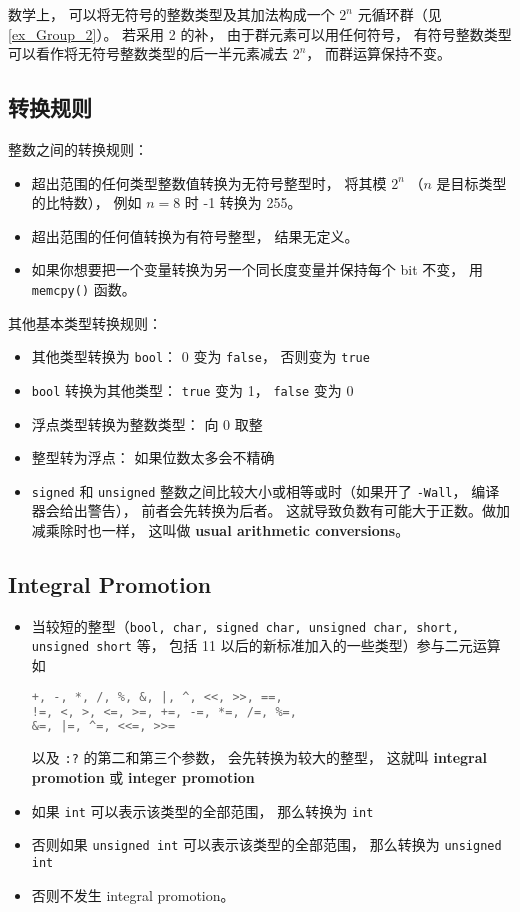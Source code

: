 数学上， 可以将无符号的整数类型及其加法构成一个 $2^n$ 元循环群（见\autoref{ex_Group_2}）。 若采用 2 的补， 由于群元素可以用任何符号， 有符号整数类型可以看作将无符号整数类型的后一半元素减去 $2^n$， 而群运算保持不变。

\subsection{转换规则}
整数之间的转换规则：
\begin{itemize}
\item 超出范围的任何类型整数值转换为无符号整型时， 将其模 $2^n$ （$n$ 是目标类型的比特数）， 例如 $n = 8$ 时 -1 转换为 255。
\item 超出范围的任何值转换为有符号整型， 结果无定义。
\item 如果你想要把一个变量转换为另一个同长度变量并保持每个 bit 不变， 用 \verb`memcpy()` 函数。
\end{itemize}
其他基本类型转换规则：
\begin{itemize}
\item 其他类型转换为 \verb`bool`： 0 变为 \verb`false`， 否则变为 \verb`true`
\item \verb`bool` 转换为其他类型： \verb`true` 变为 1， \verb`false` 变为 0
\item 浮点类型转换为整数类型： 向 0 取整
\item 整型转为浮点： 如果位数太多会不精确
\item \verb`signed` 和 \verb`unsigned` 整数之间比较大小或相等或时（如果开了 \verb`-Wall`， 编译器会给出警告）， 前者会先转换为后者。 这就导致负数有可能大于正数。做加减乘除时也一样， 这叫做 \textbf{usual arithmetic conversions}。
\end{itemize}

\subsection{Integral Promotion}
\begin{itemize}
\item 当较短的整型（\verb`bool, char, signed char, unsigned char, short, unsigned short` 等， 包括 11 以后的新标准加入的一些类型）参与二元运算如
\begin{lstlisting}[language=cpp]
+, -, *, /, %, &, |, ^, <<, >>, ==,
!=, <, >, <=, >=, +=, -=, *=, /=, %=,
&=, |=, ^=, <<=, >>=
\end{lstlisting}
以及 \verb`:?` 的第二和第三个参数， 会先转换为较大的整型， 这就叫 \textbf{integral promotion} 或 \textbf{integer promotion}
\item 如果 \verb`int` 可以表示该类型的全部范围， 那么转换为 \verb`int`
\item 否则如果 \verb`unsigned int` 可以表示该类型的全部范围， 那么转换为 \verb`unsigned int`
\item 否则不发生 integral promotion。
\end{itemize}

